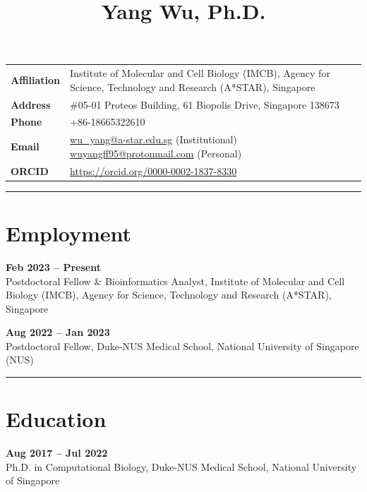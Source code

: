 \documentclass[11pt,a4paper]{article}
\title{\textbf{Yang Wu, Ph.D.}}
\author{}
\date{}
\begin{document}
\maketitle
\thispagestyle{empty}

\begin{tabularx}{\textwidth}{@{}lX@{}}
\textbf{Affiliation} & Institute of Molecular and Cell Biology (IMCB), Agency for Science, Technology and Research (A*STAR), Singapore \\
\textbf{Address}     & \#05-01 Proteos Building, 61 Biopolis Drive, Singapore 138673 \\
\textbf{Phone}       & +86-18665322610 \\
\textbf{Email}       & \href{mailto:wu_yang@a-star.edu.sg}{wu\_yang@a-star.edu.sg} (Institutional) \quad \href{mailto:wuyangff95@protonmail.com}{wuyangff95@protonmail.com} (Personal) \\
\textbf{ORCID}       & \url{https://orcid.org/0000-0002-1837-8330} \\
\end{tabularx}

\vspace{1em}
\hrule
\vspace{0.5em}

\section*{Employment}

\textbf{Feb 2023 -- Present}\\
Postdoctoral Fellow \& Bioinformatics Analyst, Institute of Molecular and Cell Biology (IMCB), Agency for Science, Technology and Research (A*STAR), Singapore

\vspace{0.3em}
\textbf{Aug 2022 -- Jan 2023}\\
Postdoctoral Fellow, Duke-NUS Medical School, National University of Singapore (NUS)

\vspace{0.5em}
\hrule
\vspace{0.5em}

\section*{Education}

\textbf{Aug 2017 -- Jul 2022}\\
Ph.D. in Computational Biology, Duke-NUS Medical School, National University of Singapore
\end{document}
